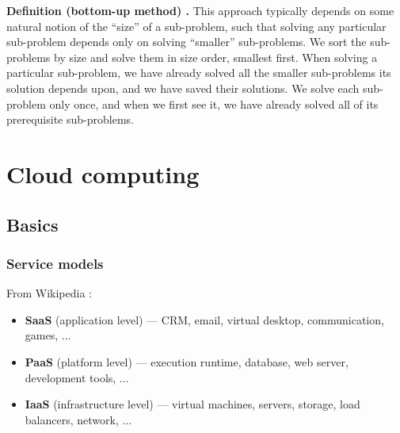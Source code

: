 \begin{shaded}
\textbf{Definition (bottom-up method) \cite{clrs_algorithms}.} This approach typically depends on some natural notion of the ``size'' of a sub-problem, such that solving any particular sub-problem depends only on solving ``smaller'' sub-problems. We sort the sub-problems by size and solve them in size order, smallest first. When solving a particular sub-problem, we have already solved all the smaller sub-problems its solution depends upon, and we have saved their solutions. We  solve each sub-problem only once, and when we first see it, we have already solved all of its prerequisite sub-problems.
\end{shaded}

\section{Cloud computing}

\subsection{Basics}

\subsubsection{Service models}

From Wikipedia \cite{wikipedia_cloud_computing}:
\begin{itemize}
	\item \textbf{SaaS} (application level) --- CRM, email, virtual desktop, communication, games, ...
	\item \textbf{PaaS} (platform level) --- execution runtime, database, web server, development tools, ...
	\item \textbf{IaaS} (infrastructure level) --- virtual machines, servers, storage, load balancers, network, ...
\end{itemize}